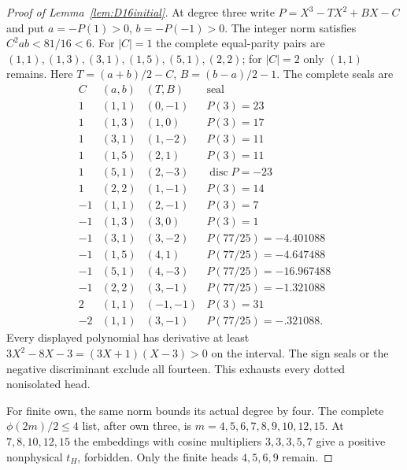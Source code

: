 \documentclass[11pt]{article}
\begin{document}
\begin{proof}[Proof of Lemma~\ref{lem:D16initial}]
At degree three write $P=X^3-TX^2+BX-C$ and put
$a=-P(1)>0$, $b=-P(-1)>0$. The integer norm satisfies
$C^2ab<81/16<6$.
For $|C|=1$ the complete equal-parity pairs are
$(1,1),(1,3),(3,1),(1,5),(5,1),(2,2)$;
for $|C|=2$ only $(1,1)$ remains.
Here $T=(a+b)/2-C$, $B=(b-a)/2-1$. The complete seals are
\[
\begin{array}{r|c|c|l}
C&(a,b)&(T,B)&\text{seal}\\\hline
1&(1,1)&(0,-1)&P(3)=23\\
1&(1,3)&(1,0)&P(3)=17\\
1&(3,1)&(1,-2)&P(3)=11\\
1&(1,5)&(2,1)&P(3)=11\\
1&(5,1)&(2,-3)&\operatorname{disc}P=-23\\
1&(2,2)&(1,-1)&P(3)=14\\
-1&(1,1)&(2,-1)&P(3)=7\\
-1&(1,3)&(3,0)&P(3)=1\\
-1&(3,1)&(3,-2)&P(77/25)=-4.401088\\
-1&(1,5)&(4,1)&P(77/25)=-4.647488\\
-1&(5,1)&(4,-3)&P(77/25)=-16.967488\\
-1&(2,2)&(3,-1)&P(77/25)=-1.321088\\
2&(1,1)&(-1,-1)&P(3)=31\\
-2&(1,1)&(3,-1)&P(77/25)=-.321088 .
\end{array}
\]
Every displayed polynomial has derivative at least
$3X^2-8X-3=(3X+1)(X-3)>0$ on the interval.
The sign seals or the negative discriminant exclude all fourteen.
This exhausts every dotted nonisolated head.

For finite own, the same norm bounds its actual degree by four.
The complete $\phi(2m)/2\le4$ list, after own three, is
$m=4,5,6,7,8,9,10,12,15$.
At $7,8,10,12,15$ the embeddings with cosine multipliers
$3,3,3,5,7$ give a positive nonphysical $t_H$, forbidden.
Only the finite heads $4,5,6,9$ remain.


\end{proof}
\end{document}
